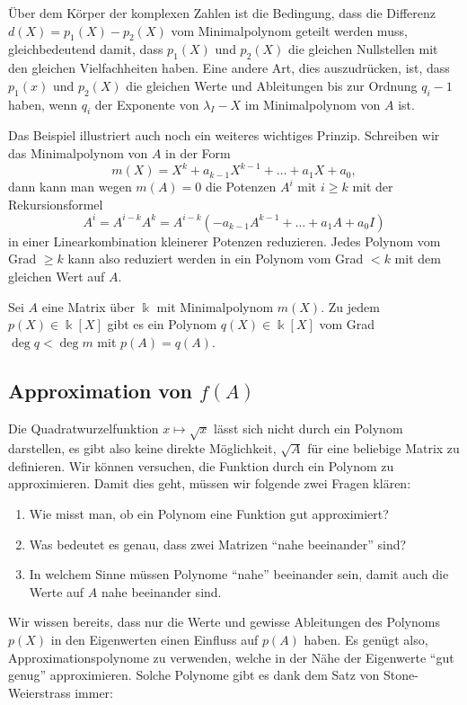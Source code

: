 Über dem Körper der komplexen Zahlen ist die Bedingung, dass die Differenz
$d(X)=p_1(X)-p_2(X)$ vom Minimalpolynom geteilt werden muss, gleichbedeutend
damit, dass $p_1(X)$ und $p_2(X)$ die gleichen Nullstellen mit den gleichen
Vielfachheiten haben.
Eine andere Art, dies auszudrücken, ist, dass $p_1(x)$ und $p_2(X)$
die gleichen Werte und Ableitungen bis zur Ordnung $q_i-1$ haben, wenn
$q_i$ der Exponente von $\lambda_I-X$ im Minimalpolynom von $A$ ist.

Das Beispiel illustriert auch noch ein weiteres wichtiges Prinzip.
Schreiben wir das Minimalpolynom von $A$ in der Form
\[
m(X)
=
X^k + a_{k-1}X^{k-1} + \dots + a_1X + a_0,
\]
dann kann man wegen $m(A)=0$ die Potenzen $A^i$ mit $i\ge k$ mit der
Rekursionsformel
\[
A^i
=
A^{i-k}A^k
=
A^{i-k}(-a_{k-1}A^{k-1}+ \dots + a_1 A + a_0I)
\]
in einer Linearkombination kleinerer Potenzen reduzieren.
Jedes Polynom vom Grad $\ge k$ kann also reduziert werden in
ein Polynom vom Grad $<k$ mit dem gleichen Wert auf $A$.

\begin{satz}
\label{buch:eigenwerte:satz:reduktion}
Sei $A$ eine Matrix über $\Bbbk$ mit Minimalpolynom $m(X)$.
Zu jedem $p(X)\in\Bbbk[X]$ gibt es ein Polynom $q(X)\in\Bbbk[X]$
vom Grad $\deg q<\deg m$ mit $p(A)=q(A)$.
\end{satz}

%
%
\subsection{Approximation von $f(A)$
\label{buch:subsection:approximation}}
Die Quadratwurzelfunktion $x\mapsto\sqrt{x}$ lässt sich nicht durch ein
%
Polynom darstellen, es gibt also keine direkte Möglichkeit, $\sqrt{A}$
für eine beliebige Matrix zu definieren.
Wir können versuchen, die Funktion durch ein Polynom zu approximieren.
Damit dies geht, müssen wir folgende zwei Fragen klären:
\begin{enumerate}
\item
Wie misst man, ob ein Polynom eine Funktion gut approximiert?
\item
Was bedeutet es genau, dass zwei Matrizen ``nahe beeinander'' sind?
\item
In welchem Sinne müssen Polynome ``nahe'' beeinander sein, damit
auch die Werte auf $A$ nahe beeinander sind.
\end{enumerate}

Wir wissen bereits, dass nur die Werte und gewisse Ableitungen des
Polynoms $p(X)$ in den Eigenwerten einen Einfluss auf $p(A)$ haben.
Es genügt also, Approximationspolynome zu verwenden, welche in der Nähe
der Eigenwerte ``gut genug'' approximieren.
Solche Polynome gibt es dank dem Satz von Stone-Weierstrass immer:

